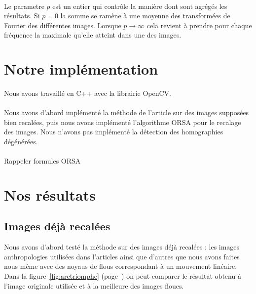 \documentclass[a4paper,10pt]{report}
\begin{document}
\paragraph{}
Le parametre \(p\) est un entier qui contrôle la manière dont sont agrégés les résultats. Si \(p = 0\) la somme 
se ramène à une moyenne des transformées de Fourier des différentes images. Lorsque \(p \rightarrow \infty \) 
cela revient à prendre pour chaque fréquence la maximale qu'elle atteint dans une des images. 

\section{Notre implémentation }
\paragraph{}
Nous avons travaillé en C++ avec la librairie OpenCV.
\paragraph{}
Nous avons d'abord implémenté la méthode de l'article sur des images supposées bien recalées, puis
nous avons implémenté l'algorithme ORSA pour le recalage des images. 
Nous n'avons pas implémenté la détection des homographies dégénérées.
\\\\
Rappeler formules ORSA

\section{Nos résultats}

\subsection{Images déjà recalées}
Nous avons d'abord testé la méthode sur des images déjà recalées : 
les images anthropologies utilisées dans l'articles ainsi que d'autres que nous avons faites 
nous même avec des noyaus de flous correspondant à un mouvement linéaire. Dans la figure~\ref{fig:arctriomphe}
(page~\pageref{fig:arctriomphe}) on peut comparer le résultat obtenu à
l'image originale utilisée et à la meilleure des images floues.
\end{document}
